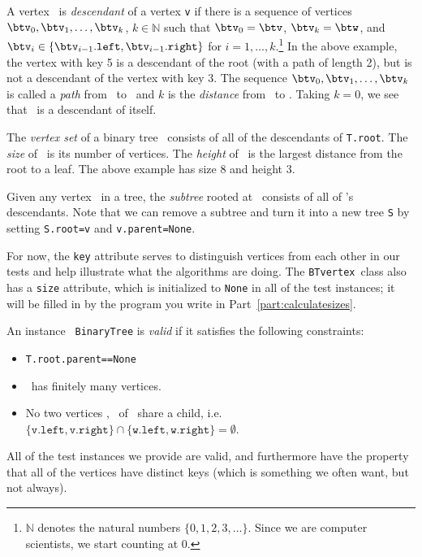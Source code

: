 \documentclass[11pt]{article}
\begin{document}
\begin{enumerate}
 A vertex \btw\ is {\em descendant} of a vertex \texttt{v} if there is a sequence of vertices $\btv_0,\btv_1,\ldots,\btv_k$, $k\in \mathbb{N}$ such that $\btv_0=\btv$, $\btv_k=\btw$, and 
 $\btv_i \in \{\btv_{i-1}.\texttt{left},\btv_{i-1}.\texttt{right}\}$ for $i=1,\ldots,k$.\footnote{$\mathbb{N}$ denotes the natural numbers $\{0,1,2,3,\ldots\}$.  Since we are computer scientists, we start counting at 0.}
 In the above example, the vertex with key 5 is a descendant of the root (with a path of length 2), but is not a descendant of the vertex with key 3.
 The sequence $\btv_0,\btv_1,\ldots,\btv_k$ is called a {\em path} from \btv\ to \btw\ and $k$ is the {\em distance} from \btv\ to \btw. Taking $k=0$, we see that \btv\ is a descendant of itself.

 The {\em vertex set} of a binary tree \treeT\ consists of all of the descendants of \texttt{T.root}. The {\em size} of \treeT\ is its number of vertices. 
 The {\em height} of \treeT\ is the largest distance from the root to a leaf.  The above example has size 8 and height 3.
 
 Given any vertex \btv\ in a tree, the {\em subtree} rooted at \btv\ consists of all of \btv's descendants.  Note that we can remove a subtree and turn it into a new tree \texttt{S} by setting
 \texttt{S.root=v} and \texttt{v.parent=None}.

 For now, the \texttt{key} attribute serves to distinguish vertices from each other in our tests and help illustrate what the algorithms are doing.  The \texttt{BTvertex}\ class
 also has a \texttt{size} attribute, which is initialized to \texttt{None} in all of the test instances; it will be filled in by the program you write in Part~\ref{part:calculatesizes}.

 An instance \treeT\ \texttt{BinaryTree} is {\em valid} if it satisfies the following constraints: \begin{itemize}
     \item \texttt{T.root.parent==None}
     \item \treeT\ has finitely many vertices.
     \item No two vertices \btv, \btw\ of \treeT\ share a child, i.e. 
     $\{\texttt{v.left},\texttt{v.right}\} \cap \{\texttt{w.left},\texttt{w.right}\} = \emptyset$. 
 \end{itemize}
 All of the test instances we provide are valid, and furthermore have the property that all of the vertices have distinct keys (which is something we often want, but not always).


\end{enumerate}
\end{document}
